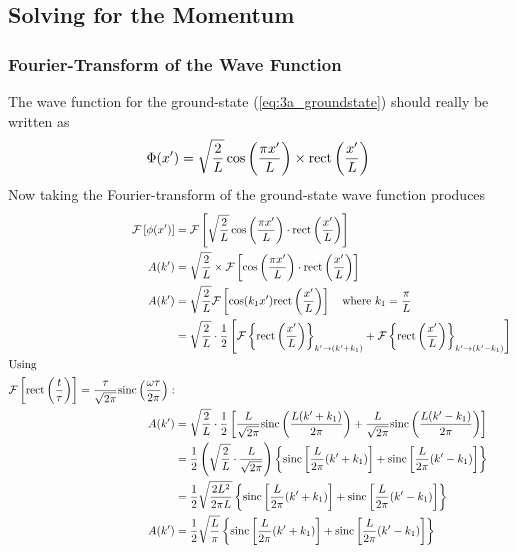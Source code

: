 \documentclass[a4paper, 10pt]{article}
\newcommand{\FT}{\mathcal{F}}
\begin{document}
\subsection{Solving for the Momentum}
\subsubsection{Fourier-Transform of the Wave Function}
The wave function for the ground-state (\ref{eq:3a_groundstate}) should really be written as
\begin{equation}
    \Phi(x') = \sqrt{\frac{2}{L}}\cos\left( \frac{\pi x'}{L} \right) \times \text{rect} \left( \frac{x'}{L} \right) \\
\end{equation}
Now taking the Fourier-transform of the ground-state wave function produces
\begin{align*}
    \FT \left[\phi(x')\right] &= \FT \left[\sqrt{\frac{2}{L}}\cos\left( \frac{\pi x'}{L} \right) \cdot \text{rect} \left( \frac{x'}{L} \right) \right] \\
    A(k') &= \sqrt{\frac{2}{L}} \times \FT \left[ \cos\left( \frac{\pi x'}{L} \right) \cdot \text{rect} \left( \frac{x'}{L} \right) \right] \\
A(k') &= \sqrt{\frac{2}{L}} \mathcal{F} \left[ \cos(k_1 x') \text{rect} \left( \frac{x'}{L} \right) \right] \quad \text{where } k_1 = \frac{\pi}{L} \\
&= \sqrt{\frac{2}{L}} \cdot \frac{1}{2} \left[ \mathcal{F}\left\{ \text{rect}\left(\frac{x'}{L}\right) \right\}_{k' \to (k'+k_1)} + \mathcal{F}\left\{ \text{rect}\left(\frac{x'}{L}\right) \right\}_{k' \to (k'-k_1)} \right] \\
\intertext{Using } \mathcal{F}\left[\text{rect}\left(\frac{t}{\tau}\right)\right] = \frac{\tau}{\sqrt{2\pi}}\mathrm{sinc}\left(\frac{\omega\tau}{2\pi}\right): \\
A(k') &= \sqrt{\frac{2}{L}} \cdot \frac{1}{2} \left[ \frac{L}{\sqrt{2\pi}} \mathrm{sinc}\left( \frac{L(k' + k_1)}{2\pi} \right) + \frac{L}{\sqrt{2\pi}} \mathrm{sinc}\left( \frac{L(k' - k_1)}{2\pi} \right) \right] \\
&= \frac{1}{2} \left( \sqrt{\frac{2}{L}} \cdot \frac{L}{\sqrt{2\pi}} \right) \left\{ \mathrm{sinc}\left[ \frac{L}{2\pi}(k' + k_1) \right] + \mathrm{sinc}\left[ \frac{L}{2\pi}(k' - k_1) \right] \right\} \\
&= \frac{1}{2} \sqrt{\frac{2L^2}{2\pi L}} \left\{ \mathrm{sinc}\left[ \frac{L}{2\pi}(k' + k_1) \right] + \mathrm{sinc}\left[ \frac{L}{2\pi}(k' - k_1) \right] \right\} \\
A(k') &= \frac{1}{2} \sqrt{\frac{L}{\pi}} \left\{ \mathrm{sinc}\left[ \frac{L}{2\pi}(k' + k_1) \right] + \mathrm{sinc}\left[ \frac{L}{2\pi}(k' - k_1) \right] \right\}
\end{align*}
\end{document}
